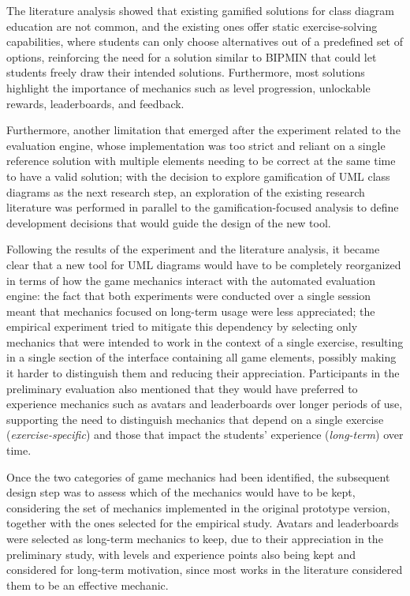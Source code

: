 
The literature analysis showed that existing gamified solutions for class diagram education are not common, and the existing ones offer static exercise-solving capabilities, where students can only choose alternatives out of a predefined set of options, reinforcing the need for a solution similar to BIPMIN that could let students freely draw their intended solutions. Furthermore, most solutions highlight the importance of mechanics such as level progression, unlockable rewards, leaderboards, and feedback. 


Furthermore, another limitation that emerged after the experiment related to the evaluation engine, whose implementation was too strict and reliant on a single reference solution with multiple elements needing to be correct at the same time to have a valid solution; with the decision to explore gamification of UML class diagrams as the next research step, an exploration of the existing research literature was performed in parallel to the gamification-focused analysis to define development decisions that would guide the design of the new tool. 
 
Following the results of the experiment and the literature analysis, it became clear that a new tool for UML diagrams would have to be completely reorganized in terms of how the game mechanics interact with the automated evaluation engine: the fact that both experiments were conducted over a single session meant that mechanics focused on long-term usage were less appreciated; the empirical experiment tried to mitigate this dependency by selecting only mechanics that were intended to work in the context of a single exercise, resulting in a single section of the interface containing all game elements, possibly making it harder to distinguish them and reducing their appreciation. Participants in the preliminary evaluation also mentioned that they would have preferred to experience mechanics such as avatars and leaderboards over longer periods of use, supporting the need to distinguish mechanics that depend on a single exercise (\textit{exercise-specific}) and those that impact the students' experience (\textit{long-term}) over time. 

Once the two categories of game mechanics had been identified, the subsequent design step was to assess which of the mechanics would have to be kept, considering the set of mechanics implemented in the original prototype version, together with the ones selected for the empirical study. Avatars and leaderboards were selected as long-term mechanics to keep, due to their appreciation in the preliminary study, with levels and experience points also being kept and considered for long-term motivation, since most works in the literature considered them to be an effective mechanic.

